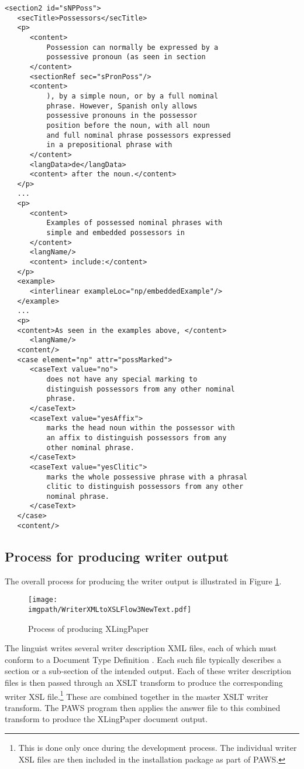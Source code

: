 \ea  \label{xPossessorPracticalWriter}%
\begin{verbatim}
<section2 id="sNPPoss"> 
   <secTitle>Possessors</secTitle> 
   <p> 
      <content>
          Possession can normally be expressed by a 
          possessive pronoun (as seen in section 
      </content> 
      <sectionRef sec="sPronPoss"/> 
      <content>
          ), by a simple noun, or by a full nominal 
          phrase. However, Spanish only allows 
          possessive pronouns in the possessor 
          position before the noun, with all noun 
          and full nominal phrase possessors expressed 
          in a prepositional phrase with 
      </content>
      <langData>de</langData> 
      <content> after the noun.</content> 
   </p>
   ... 
   <p> 
      <content>
          Examples of possessed nominal phrases with 
          simple and embedded possessors in 
      </content>
      <langName/>
      <content> include:</content>
   </p> 
   <example>
      <interlinear exampleLoc="np/embeddedExample"/>
   </example> 
   ... 
   <p> 
   <content>As seen in the examples above, </content>
      <langName/>
   <content/> 
   <case element="np" attr="possMarked"> 
      <caseText value="no"> 
          does not have any special marking to 
          distinguish possessors from any other nominal 
          phrase.
      </caseText> 
      <caseText value="yesAffix"> 
          marks the head noun within the possessor with 
          an affix to distinguish possessors from any 
          other nominal phrase.
      </caseText> 
      <caseText value="yesClitic"> 
          marks the whole possessive phrase with a phrasal 
          clitic to distinguish possessors from any other 
          nominal phrase.
      </caseText>
   </case>
   <content/> 
\end{verbatim}
\z

\subsection{Process for producing writer output}\label{sProcessProducingWriterOutput}
The overall process for producing the writer output is illustrated in Figure \ref{xWriterToOutput}.

\begin{figure}
\texttt{[image: \\imgpath/WriterXMLtoXSLFlow3NewText.pdf]}
\caption{Process of producing XLingPaper} 
 \label{xWriterToOutput}%
\end{figure}

The linguist writes several writer description XML files, each of which must conform to a Document Type Definition \citep[also known as a DTD; see ][]{rW3CDTD}. Each such file typically describes a section or a sub-section of the intended output. Each of these writer description files is then passed through an XSLT transform to produce the corresponding writer XSL file.\footnote{\label{nWriterToXSLDoneOnce} 
 This is done only once during the development process. The individual writer XSL files are then included in the installation package as part of {PAWS}.
} 
These are combined together in the master XSLT writer transform. The PAWS program then applies the answer file to this combined transform to produce the XLingPaper document output.

